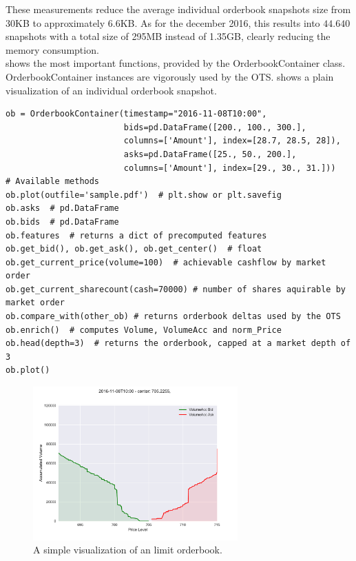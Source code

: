 These measurements reduce the average individual orderbook snapshots size from 30KB to approximately 6.6KB. As for the december 2016, this results into $44.640$ snapshots with a total size of 295MB instead of 1.35GB, clearly reducing the memory consumption.\\

 shows the most important functions, provided by the OrderbookContainer class. OrderbookContainer instances are vigorously used by the \ac{OTS}.  shows a plain visualization of an individual orderbook snapshot.

\begin{lstlisting}[frame=single, breaklines=true, basicstyle=\scriptsize, caption=OrderbookContainer, label=lst:OrderbookContainer]
ob = OrderbookContainer(timestamp="2016-11-08T10:00",
                        bids=pd.DataFrame([200., 100., 300.],
                        columns=['Amount'], index=[28.7, 28.5, 28]),
                        asks=pd.DataFrame([25., 50., 200.],
                        columns=['Amount'], index=[29., 30., 31.]))
# Available methods
ob.plot(outfile='sample.pdf')  # plt.show or plt.savefig
ob.asks  # pd.DataFrame
ob.bids  # pd.DataFrame
ob.features  # returns a dict of precomputed features
ob.get_bid(), ob.get_ask(), ob.get_center()  # float
ob.get_current_price(volume=100)  # achievable cashflow by market order
ob.get_current_sharecount(cash=70000) # number of shares aquirable by market order
ob.compare_with(other_ob) # returns orderbook deltas used by the OTS
ob.enrich()  # computes Volume, VolumeAcc and norm_Price
ob.head(depth=3)  # returns the orderbook, capped at a market depth of 3
ob.plot()
\end{lstlisting}


\begin{figure}[ht]
	\centering
   \includegraphics[width=0.7\textwidth]{content/drawings/orderbook}
	\caption{A simple visualization of an limit orderbook.}
	\label{fig:orderbook}
\end{figure}


